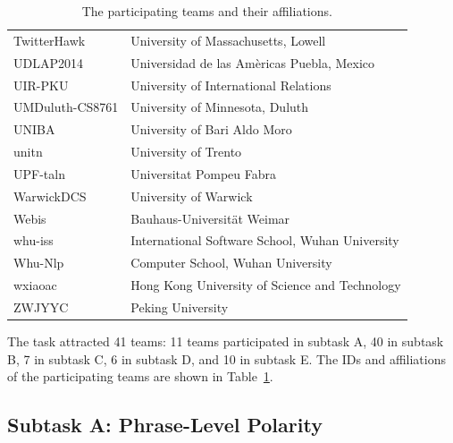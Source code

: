 \documentclass[11pt]{article}
\begin{document}
\begin{table}[t]
\begin{center}
{\begin{tabular}{ll}
TwitterHawk & University of Massachusetts, Lowell\\
UDLAP2014 & Universidad de las Am\`{e}ricas Puebla, Mexico\\
UIR-PKU & University of International Relations\\
UMDuluth-CS8761 & University of Minnesota, Duluth\\
UNIBA & University of Bari Aldo Moro\\
unitn & University of Trento\\
UPF-taln & Universitat Pompeu Fabra\\
WarwickDCS & University of Warwick\\
Webis & Bauhaus-Universit\"{a}t Weimar\\
whu-iss & International Software School, Wuhan University\\
Whu-Nlp & Computer School, Wuhan University\\
wxiaoac & Hong Kong University of Science and Technology\\
ZWJYYC & Peking University\\
\hline
\end{tabular}
}
\caption{The participating teams and their affiliations.}
\label{tab:participants}
\end{center}
\vspace*{-5mm}
\end{table}

The task attracted 41 teams:
11 teams participated in subtask A,
40 in subtask B,
 7 in subtask C,
 6 in subtask D, and
10 in subtask E.
The IDs and affiliations of the participating teams are shown in Table~\ref{tab:participants}.

\subsection{Subtask A: Phrase-Level Polarity}
\end{document}
